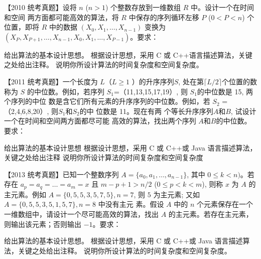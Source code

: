 \begin{qitems}
    \begin{bbox}
        \qitem 【2010 统考真题】设将 $n$ ($n>1$) 个整数存放到一维数组 $R$ 中。设计一个在时间和空间
        两方面都可能高效的算法，将 $R$ 中保存的序列循环左移 $P$ ($0<P<n$) 个位置，即将 $R$
        中的数据 $(X_0, X_1, \dots, X_{n-1})$ 变换为 $(X_P, X_{P+1}, \dots, X_{n-1}, X_0, X_1, \dots, X_{P-1})$。要求：
        \begin{subqitems}
            \subqitem 给出算法的基本设计思想。
            \subqitem 根据设计思想，采用 C 或 C++语言描述算法，关键之处给出注释。
            \subqitem 说明你所设计算法的时间复杂度和空间复杂度。
        \end{subqitems}
    \end{bbox}

    \begin{bbox}
        \qitem 【2011 统考真题】一个长度为 $L$（$L\geqslant 1$ ）的升序序列$ S$, 处在第$\lceil L/2\rceil $个位置的数称为 $S$
        的中位数。例如，若序列 $S_1$=（11,13,15,17,19）, 则 $S_1$的中位数是 15, 两 个序列的中位
        数是含它们所有元素的升序序列的中位数。例如，若 $S_2$ =（2,4,6,8,20）, 则$S_1$和$S_2$的中
        位数是 11。现在有两 个等长升序序列$A$和$B$, 试设计一个在时间和空间两方面都尽可能
        高效的算法，找出两个序列 $A$和$B$的中位数。要求：
        \begin{subqitems}
            \subqitem 给出算法的基本设计思想
            \subqitem  根据设计思想，采用 C 或 C++或 Java 语言描述算法，关键之处给出注释
            \subqitem 说明你所设计算法的时间复杂度和空间复杂度
        \end{subqitems}
    \end{bbox}

    \begin{bbox}
        \qitem 【2013 统考真题】已知一个整数序列 $A=\{a_0, a_1, \dots, a_{n-1}\}$, 其中 $0\leqslant k<n)$。若
        存在 $a_p=a_q=\dots=a_m=x$ 且 $m-p+1>n/2$ ($0\leqslant p<k<m$), 则称 $x$ 为 $A$ 的主元素。例如
        $A=\{0,5,5,3,5,7,5\}, n=7$, 则 $5$ 为主元素; 又如 $A=\{0,5,5,3,5,1,5,7\}, n=8$ 中没有主元
        素。假设 $A$ 中的 $n$ 个元素保存在一个一维数组中，请设计一个尽可能高效的算法，找出
        $A$ 的主元素。若存在主元素，则输出该元素；否则输出 $-1$。要求：
        \begin{subqitems}
            \subqitem 给出算法的基本设计思想。
            \subqitem 根据设计思想，采用 C 或 C++或 Java 语言描述算法，关键之处给出注释。
            \subqitem 说明你所设计算法的时间复杂度和空间复杂度。
        \end{subqitems}
    \end{bbox}


\end{qitems}
